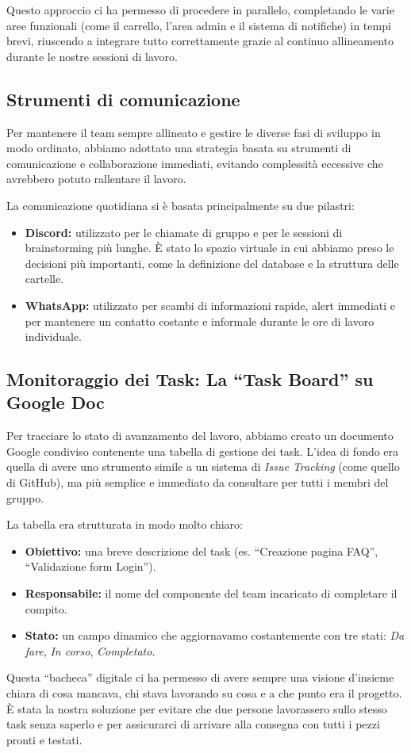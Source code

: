 \documentclass[11pt,a4paper]{article}
\begin{document}
Questo approccio ci ha permesso di procedere in parallelo, completando le varie aree funzionali (come il carrello, l'area admin e il sistema di notifiche) in tempi brevi, riuscendo a integrare tutto correttamente grazie al continuo allineamento durante le nostre sessioni di lavoro.

\subsection{Strumenti di comunicazione}

Per mantenere il team sempre allineato e gestire le diverse fasi di sviluppo in modo ordinato, abbiamo adottato una strategia basata su strumenti di comunicazione e collaborazione immediati, evitando complessità eccessive che avrebbero potuto rallentare il lavoro.

La comunicazione quotidiana si è basata principalmente su due pilastri:
\begin{itemize}
    \item \textbf{Discord:} utilizzato per le chiamate di gruppo e per le sessioni di brainstorming più lunghe. È stato lo spazio virtuale in cui abbiamo preso le decisioni più importanti, come la definizione del database e la struttura delle cartelle.
    \item \textbf{WhatsApp:} utilizzato per scambi di informazioni rapide, alert immediati e per mantenere un contatto costante e informale durante le ore di lavoro individuale.
\end{itemize}

\subsection{Monitoraggio dei Task: La ``Task Board'' su Google Doc}
Per tracciare lo stato di avanzamento del lavoro, abbiamo creato un documento Google condiviso contenente una tabella di gestione dei task. L'idea di fondo era quella di avere uno strumento simile a un sistema di \textit{Issue Tracking} (come quello di GitHub), ma più semplice e immediato da consultare per tutti i membri del gruppo.

La tabella era strutturata in modo molto chiaro:
\begin{itemize}
    \item \textbf{Obiettivo:} una breve descrizione del task (es. ``Creazione pagina FAQ'', ``Validazione form Login'').
    \item \textbf{Responsabile:} il nome del componente del team incaricato di completare il compito.
    \item \textbf{Stato:} un campo dinamico che aggiornavamo costantemente con tre stati: \textit{Da fare}, \textit{In corso}, \textit{Completato}.
\end{itemize}

Questa ``bacheca'' digitale ci ha permesso di avere sempre una visione d'insieme chiara di cosa mancava, chi stava lavorando su cosa e a che punto era il progetto. È stata la nostra soluzione per evitare che due persone lavorassero sullo stesso task senza saperlo e per assicurarci di arrivare alla consegna con tutti i pezzi pronti e testati.
\end{document}
